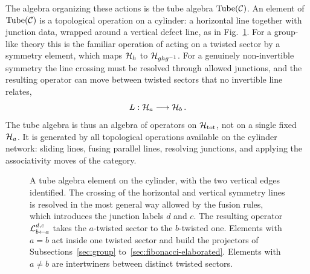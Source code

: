 \documentclass[11pt]{article}
\numberwithin{equation}{section}
\begin{document}
The algebra organizing these actions is the tube algebra $\mathrm{Tube}(\mathcal{C})$. An element of
$\mathrm{Tube}(\mathcal{C})$ is a topological operation on a cylinder: a horizontal line together with junction
data, wrapped around a vertical defect line, as in Fig.~\ref{fig:tube}. For a group-like theory
this is the familiar operation of acting on a twisted sector by a symmetry element, which maps $\mathcal{H}_h$ to $\mathcal{H}_{ghg^{-1}}$. For a
genuinely non-invertible symmetry the line crossing must be resolved through allowed junctions,
and the resulting operator can move between twisted sectors that no invertible line relates,
\begin{equation}
  L : \mathcal{H}_a \longrightarrow \mathcal{H}_b \,.
  \label{eq:intertwiner}
\end{equation}
The tube algebra is thus an algebra of operators on $\mathcal{H}_{\rm tot}$, not on a single fixed $\mathcal{H}_a$. It is
generated by all topological operations available on the cylinder network: sliding lines, fusing
parallel lines, resolving junctions, and applying the associativity moves of the category.

\begin{figure}[H]
  \centering
{}
  \caption{A tube algebra element on the cylinder, with the two vertical edges identified. The
  crossing of the horizontal and vertical symmetry lines is resolved in the most general way
  allowed by the fusion rules, which introduces the junction labels $d$ and $c$. The resulting
  operator $\mathcal{L}^{d,c}_{b \leftarrow a}$ takes the $a$-twisted sector to the $b$-twisted one. Elements
  with $a=b$ act inside one twisted sector and build the projectors of
  Subsections~\ref{sec:group} to~\ref{sec:fibonacci-elaborated}. Elements with $a \neq b$ are intertwiners between
  distinct twisted sectors.}
  \label{fig:tube}
\end{figure}
\end{document}
